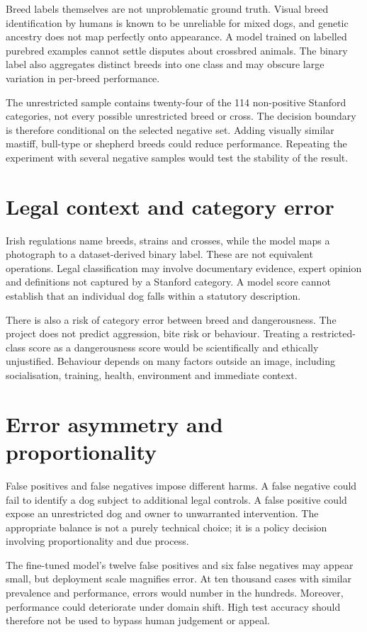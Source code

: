 Breed labels themselves are not unproblematic ground truth. Visual breed identification by humans is known to be unreliable for mixed dogs, and genetic ancestry does not map perfectly onto appearance. A model trained on labelled purebred examples cannot settle disputes about crossbred animals. The binary label also aggregates distinct breeds into one class and may obscure large variation in per-breed performance.

The unrestricted sample contains twenty-four of the 114 non-positive Stanford categories, not every possible unrestricted breed or cross. The decision boundary is therefore conditional on the selected negative set. Adding visually similar mastiff, bull-type or shepherd breeds could reduce performance. Repeating the experiment with several negative samples would test the stability of the result.

\section{Legal context and category error}
Irish regulations name breeds, strains and crosses, while the model maps a photograph to a dataset-derived binary label. These are not equivalent operations. Legal classification may involve documentary evidence, expert opinion and definitions not captured by a Stanford category. A model score cannot establish that an individual dog falls within a statutory description.

There is also a risk of category error between breed and dangerousness. The project does not predict aggression, bite risk or behaviour. Treating a restricted-class score as a dangerousness score would be scientifically and ethically unjustified. Behaviour depends on many factors outside an image, including socialisation, training, health, environment and immediate context.

\section{Error asymmetry and proportionality}
False positives and false negatives impose different harms. A false negative could fail to identify a dog subject to additional legal controls. A false positive could expose an unrestricted dog and owner to unwarranted intervention. The appropriate balance is not a purely technical choice; it is a policy decision involving proportionality and due process.

The fine-tuned model's twelve false positives and six false negatives may appear small, but deployment scale magnifies error. At ten thousand cases with similar prevalence and performance, errors would number in the hundreds. Moreover, performance could deteriorate under domain shift. High test accuracy should therefore not be used to bypass human judgement or appeal.

